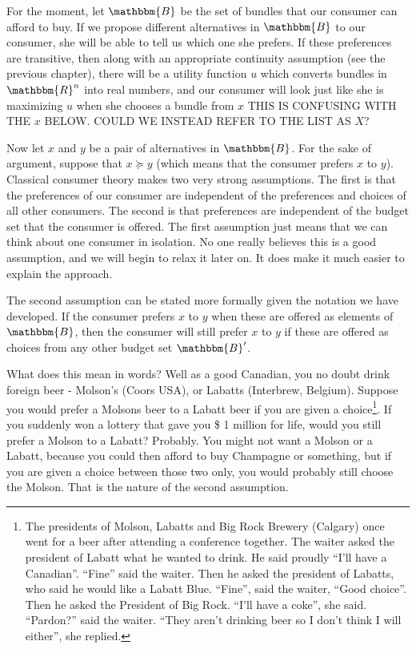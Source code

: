 \documentclass[12pt]{article}
\begin{document}
For the moment, let $\mathbbm{B}$ be the set of bundles that our consumer can
afford to buy. If we propose different alternatives in $\mathbbm{B}$ to our
consumer, she will be able to tell us which one she prefers. If these
preferences are transitive, then along with an appropriate continuity
assumption (see the previous chapter), there will be a utility function $u$
which converts bundles in $\mathbbm{R}^n$ into real numbers, and our consumer
will look just like she is maximizing $u$ when she chooses a bundle from $x$ THIS IS CONFUSING WITH THE $x$ BELOW. COULD WE INSTEAD REFER TO THE LIST AS $X$?

Now let $x$ and $y$ be a pair of alternatives in $\mathbbm{B}$. For the sake
of argument, suppose that $x \succeq y$ (which means that the consumer prefers
$x$ to $y$). Classical consumer theory makes two very strong assumptions. The
first is that the preferences of our consumer are independent of the
preferences and choices of all other consumers. The second is that preferences
are independent of the budget set that the consumer is offered. The first
assumption just means that we can think about one consumer in isolation. No
one really believes this is a good assumption, and we will begin to relax it
later on. It does make it much easier to explain the approach.

The second assumption can be stated more formally given the notation we have
developed. If the consumer prefers $x$ to $y$ when these are offered as
elements of $\mathbbm{B}$, then the consumer will still prefer $x$ to $y$ if
these are offered as choices from any other budget set $\mathbbm{B}'$.

What does this mean in words? Well as a good Canadian, you no doubt drink
foreign beer - Molson's (Coors USA), or Labatts (Interbrew, Belgium). Suppose
you would prefer a Molsons beer to a Labatt beer if you are given a
choice{\footnote{The presidents of Molson, Labatts and Big Rock Brewery
(Calgary) once went for a beer after attending a conference together. The
waiter asked the president of Labatt what he wanted to drink. He said proudly
``I'll have a Canadian''. ``Fine'' said the waiter. Then he asked the
president of Labatts, who said he would like a Labatt Blue. ``Fine'', said the
waiter, ``Good choice''. Then he asked the President of Big Rock. ``I'll have
a coke'', she said. ``Pardon?'' said the waiter. ``They aren't drinking beer
so I don't think I will either'', she replied.}}. If you suddenly won a lottery
that gave you  \$  1 million for life, would you still prefer a Molson to a
Labatt? Probably. You might not want a Molson or a Labatt, because you could
then afford to buy Champagne or something, but if you are given a choice
between those two only, you would probably still choose the Molson. That is
the nature of the second assumption.
\end{document}
